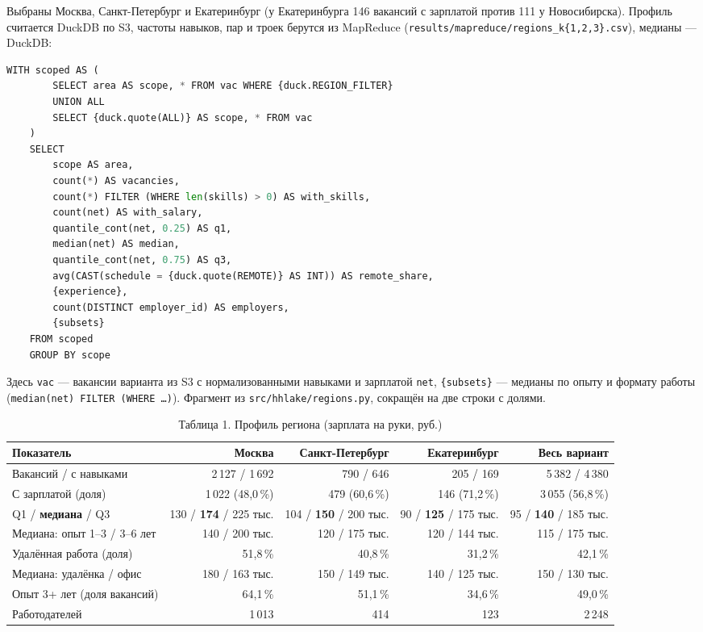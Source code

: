 \documentclass[11pt,a4paper]{article}
\newcommand{\code}[1]{\texttt{#1}}
\begin{document}
Выбраны Москва, Санкт-Петербург и Екатеринбург (у Екатеринбурга 146 вакансий с зарплатой против 111 у Новосибирска). Профиль считается DuckDB по S3, частоты навыков, пар и троек берутся из MapReduce (\code{results/mapreduce/regions\_k\{1,2,3\}.csv}), медианы --- DuckDB:
\begin{lstlisting}[language=Python]
    WITH scoped AS (
        SELECT area AS scope, * FROM vac WHERE {duck.REGION_FILTER}
        UNION ALL
        SELECT {duck.quote(ALL)} AS scope, * FROM vac
    )
    SELECT
        scope AS area,
        count(*) AS vacancies,
        count(*) FILTER (WHERE len(skills) > 0) AS with_skills,
        count(net) AS with_salary,
        quantile_cont(net, 0.25) AS q1,
        median(net) AS median,
        quantile_cont(net, 0.75) AS q3,
        avg(CAST(schedule = {duck.quote(REMOTE)} AS INT)) AS remote_share,
        {experience},
        count(DISTINCT employer_id) AS employers,
        {subsets}
    FROM scoped
    GROUP BY scope
\end{lstlisting}
Здесь \code{vac} --- вакансии варианта из S3 с нормализованными навыками и зарплатой \code{net}, \code{\{subsets\}} --- медианы по опыту и формату работы (\code{median(net) FILTER (WHERE \dots)}). Фрагмент из \code{src/hhlake/regions.py}, сокращён на две строки с долями.

\begin{table}[H]
\centering
\footnotesize
\caption{Таблица 1. Профиль региона (зарплата на руки, руб.)}
\begin{tabular}{@{}lrrrr@{}}
\toprule
Показатель & Москва & Санкт-Петербург & Екатеринбург & Весь вариант \\
\midrule
Вакансий / с навыками & 2\,127 / 1\,692 & 790 / 646 & 205 / 169 & 5\,382 / 4\,380 \\
С зарплатой (доля) & 1\,022 (48,0\,\%) & 479 (60,6\,\%) & 146 (71,2\,\%) & 3\,055 (56,8\,\%) \\
Q1 / \textbf{медиана} / Q3 & 130 / \textbf{174} / 225 тыс. & 104 / \textbf{150} / 200 тыс. & 90 / \textbf{125} / 175 тыс. & 95 / \textbf{140} / 185 тыс. \\
Медиана: опыт 1--3 / 3--6 лет & 140 / 200 тыс. & 120 / 175 тыс. & 120 / 144 тыс. & 115 / 175 тыс. \\
Удалённая работа (доля) & 51,8\,\% & 40,8\,\% & 31,2\,\% & 42,1\,\% \\
Медиана: удалёнка / офис & 180 / 163 тыс. & 150 / 149 тыс. & 140 / 125 тыс. & 150 / 130 тыс. \\
Опыт 3+ лет (доля вакансий) & 64,1\,\% & 51,1\,\% & 34,6\,\% & 49,0\,\% \\
Работодателей & 1\,013 & 414 & 123 & 2\,248 \\
\bottomrule
\end{tabular}
\end{table}
\end{document}

